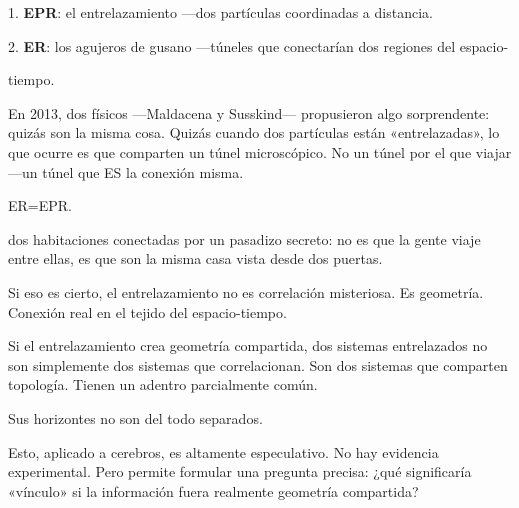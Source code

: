 1. \textbf{EPR}: el entrelazamiento —dos partículas coordinadas a distancia.

2. \textbf{ER}: los agujeros de gusano —túneles que conectarían dos regiones del espacio-

tiempo.

En 2013, dos físicos —Maldacena y Susskind— propusieron algo sorprendente: quizás son la misma cosa. Quizás cuando dos partículas están «entrelazadas», lo que ocurre es que comparten un túnel microscópico. No un túnel por el que viajar —un túnel que ES la conexión misma.

\begin{fisica}
 ER=EPR.

 dos habitaciones conectadas por un pasadizo secreto: no es que la gente viaje entre ellas, es que son la misma casa vista desde dos puertas.
\end{fisica}
Si eso es cierto, el entrelazamiento no es correlación misteriosa. Es geometría. Conexión real en el tejido del espacio-tiempo.

\noindent Si el entrelazamiento crea geometría compartida, dos sistemas entrelazados no son simplemente dos sistemas que correlacionan. Son dos sistemas que comparten topología. Tienen un adentro parcialmente común.

Sus horizontes no son del todo separados.

Esto, aplicado a cerebros, es altamente especulativo. No hay evidencia experimental. Pero permite formular una pregunta precisa: ¿qué significaría «vínculo» si la información fuera realmente geometría compartida?

